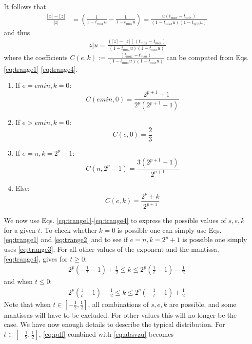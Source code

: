 \documentclass[10pt,a4paper]{article}
\theoremstyle{plain}
\theoremstyle{definition}
\newcommand{\ceil}[1]{\lceil #1 \rceil}
\newcommand{\floor}[1]{\lfloor #1 \rfloor}
\newcommand{\absv}[1]{\vert #1\vert}
\begin{document}
It follows that 
\begin{align*}
\frac{\ceil{z}-\floor{z}}{\absv{z}}&=\left(\frac{1}{1-t_{max}u}-\frac{1}{1-t_{min}u}\right)=\frac{u(t_{max}-t_{min})}{(1-t_{max}u)(1-t_{min}u)}
\end{align*}
and thus
\begin{align}
\absv{z}u=\frac{(\ceil{z}-\floor{z})(t_{max}-t_{min})}{(1-t_{max}u)(1-t_{min}u)}\label{eq:absvzu}
\end{align}
where the coefficients $C(e,k):=\frac{(t_{max}-t_{min})}{(1-t_{max}u)(1-t_{min}u)}$ can be computed from Eqs. \eqref{eq:trange1}-\eqref{eq:trange4}.
\begin{enumerate}
\item  If $e=emin, k=0$:
\[
C(emin,0)=\frac{2^{p+1}+1}{2^p(2^{p+1}-1)}
\]
\item If $e>emin, k=0$:
\[
C(e,0)=\frac{2}{3}
\]
\item  If $e=n, k=2^p-1$:
\[
C(n,2^p-1)=\frac{3(2^{p+1}-1)}{2^{p+1}}
\]
\item Else:
\[
C(e,k)=\frac{2^p+k}{2^{p+1}}
\]
\end{enumerate}


We now use Eqs. \eqref{eq:trange1}-\eqref{eq:trange4} to express the possible values of $s,e,k$ for a given $t$. To check whether $k=0$ is possible one can simply use Eqs. \eqref{eq:trange1} and \eqref{eq:trange2} and to see if $e=n, k=2^p+1$ is possible one simply uses \eqref{eq:trange3}. For all other values of the exponent and the mantissa, \eqref{eq:trange4}, gives for $t\geq 0$:
\begin{align}
2^p\left(-\frac{1}{t}-1\right)+\frac{1}{2}\leq k\leq 2^p\left(\frac{1}{t}-1\right)-\frac{1}{2}\label{eq:kfromtpos}
\end{align}
and when $t\leq 0$:
\begin{align}
2^p\left(\frac{1}{t}-1\right)-\frac{1}{2}\leq k\leq 2^p\left(-\frac{1}{t}-1\right)+\frac{1}{2}\label{eq:kfromtneg}
\end{align}
Note that when $t\in\left[-\frac{1}{2},\frac{1}{2}\right]$, all combinations of $s,e,k$ are possible, and some mantissas will have to be excluded. For other values this will no longer be the case.
We have now enough details to describe the typical distribution. For $t\in\left[-\frac{1}{2},\frac{1}{2}\right]$, \eqref{eq:pdf} combined with \eqref{eq:absvzu} becomes 
\end{document}
